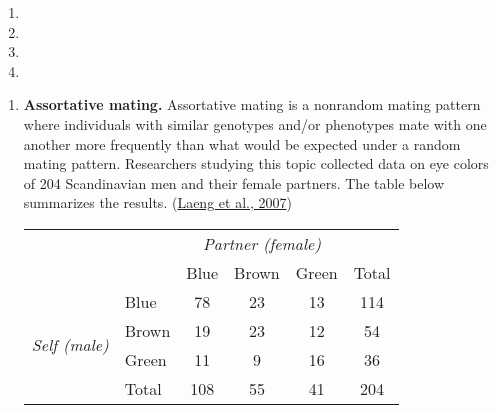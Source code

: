 \documentclass[
]{article}
\providecommand{\tightlist}{%
  \setlength{\itemsep}{0pt}\setlength{\parskip}{0pt}}
\begin{document}
\begin{blackbox}

\begin{enumerate}
\def\labelenumi{(\alph{enumi})}
\tightlist
\item
\item
\item
\item
\end{enumerate}

\end{blackbox}

\begin{enumerate}
\def\labelenumi{\arabic{enumi}.}
\setcounter{enumi}{1}
\item
  \textbf{Assortative mating.} Assortative mating is a nonrandom mating pattern where individuals with similar genotypes and/or phenotypes mate with one another more frequently than what would be expected under a random mating pattern. Researchers studying this topic collected data on eye colors of 204 Scandinavian men and their female partners. The table below summarizes the results. (\protect\hyperlink{ref-Laeng:2007}{Laeng et al., 2007})

  \begin{center}
  \begin{tabular}{ll  ccc c} 
                                          &           & \multicolumn{3}{c}{\textit{Partner (female)}} \\
  \cline{3-5}
                                          &           & Blue  & Brown     & Green     & Total \\
  \cline{2-6}
                                          & Blue      & 78    & 23        & 13        & 114 \\
  \multirow{2}{*}{\textit{Self (male)}}   & Brown     & 19    & 23        & 12        & 54 \\
                                          & Green     & 11    & 9         & 16        & 36 \\
  \cline{2-6}  
                                          & Total     & 108   & 55        & 41        & 204
  \end{tabular}
  \end{center}


\end{enumerate}
\end{document}
